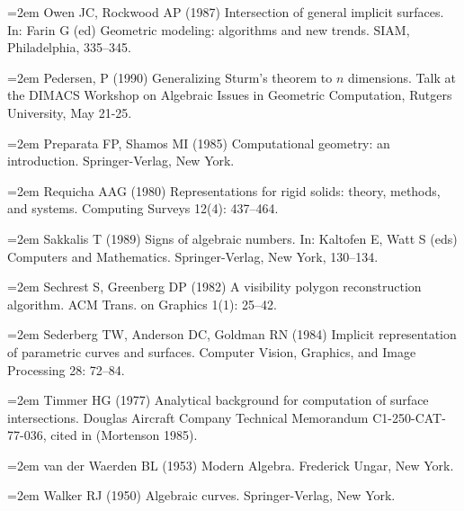 \hangindent=2em  %
\noindent 
Owen JC, Rockwood AP (1987)
Intersection of general implicit surfaces.
In: Farin G (ed) \mbox{Geometric} modeling: algorithms and new trends.
SIAM, Philadelphia, 335--345.

\hangindent=2em  %
\noindent 
Pedersen, P (1990) Generalizing Sturm's theorem to $n$ dimensions.
Talk at the DIMACS Workshop on Algebraic Issues in Geometric Computation,
Rutgers University, May 21-25.

\hangindent=2em  %
\noindent 
Preparata FP, Shamos MI (1985) Computational geometry: an introduction.
Springer-Verlag, New York.

\hangindent=2em  %
\noindent 
Requicha AAG (1980) 
Representations for rigid solids: theory, methods, and systems.
Computing Surveys 12(4): 437--464.

\hangindent=2em  %
\noindent 
Sakkalis T (1989)
Signs of algebraic numbers.
In: Kaltofen E, Watt S (eds) Computers and Mathematics. 
Springer-Verlag, New York, 130--134.

\hangindent=2em  %
\noindent 
Sechrest S, Greenberg DP (1982)
A visibility polygon reconstruction algorithm.
ACM Trans. on Graphics 1(1): 25--42.

\hangindent=2em  %
\noindent 
Sederberg TW, Anderson DC, Goldman RN (1984)
Implicit representation of parametric curves and surfaces.
Computer Vision, Graphics, and Image Processing 28: 72--84.

\hangindent=2em  %
\noindent 
Timmer HG (1977) 
Analytical background for computation of surface intersections.
Douglas Aircraft Company Technical Memorandum C1-250-CAT-77-036, 
cited in (Mortenson 1985). 

\hangindent=2em  %
\noindent 
van der Waerden BL (1953) Modern Algebra.
Frederick Ungar, New York.

\hangindent=2em  %
\noindent 
Walker RJ (1950) Algebraic curves.
Springer-Verlag, New York.


